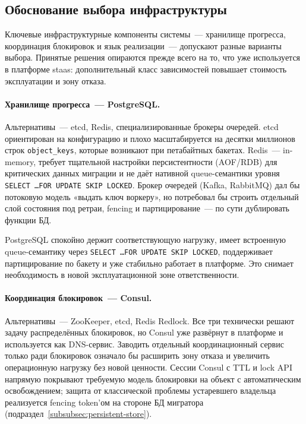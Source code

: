 \subsection{Обоснование выбора инфраструктуры}\label{subsec:tech-choice}

Ключевые инфраструктурные компоненты системы~--- хранилище прогресса, координация блокировок и язык реализации~--- допускают разные варианты выбора.
Принятые решения опираются прежде всего на то, что уже используется в платформе \gls{staas}: дополнительный класс зависимостей повышает стоимость эксплуатации и зону отказа.

\paragraph{Хранилище прогресса~--- PostgreSQL.}
Альтернативы~--- etcd, Redis, специализированные брокеры очередей.
etcd ориентирован на конфигурацию и плохо масштабируется на десятки миллионов строк \texttt{object\_keys}, которые возникают при петабайтных бакетах.
Redis~--- in-memory, требует тщательной настройки персистентности (AOF/RDB) для критических данных миграции и не даёт нативной queue-семантики уровня \texttt{SELECT \ldots FOR UPDATE SKIP LOCKED}.
Брокер очередей (Kafka, RabbitMQ) дал бы потоковую модель «выдать ключ воркеру», но потребовал бы строить отдельный слой состояния под ретраи, fencing и партицирование~--- по сути дублировать функции БД.

PostgreSQL спокойно держит соответствующую нагрузку, имеет встроенную queue-семантику через \texttt{SELECT \ldots FOR UPDATE SKIP LOCKED}, поддерживает партицирование по бакету и уже стабильно работает в платформе.
Это снимает необходимость в новой эксплуатационной зоне ответственности.

\paragraph{Координация блокировок~--- Consul.}
Альтернативы~--- ZooKeeper, etcd, Redis Redlock.
Все три технически решают задачу распределённых блокировок, но Consul уже развёрнут в платформе и используется как DNS-сервис.
Заводить отдельный координационный сервис только ради блокировок означало бы расширить зону отказа и увеличить операционную нагрузку без новой ценности.
Сессии Consul с TTL и lock API напрямую покрывают требуемую модель блокировки на объект с автоматическим освобождением; защита от классической проблемы устаревшего владельца~\cite{kleppmann-locks} реализуется fencing token'ом на стороне БД мигратора (подраздел~\ref{subsubsec:persistent-store}).

